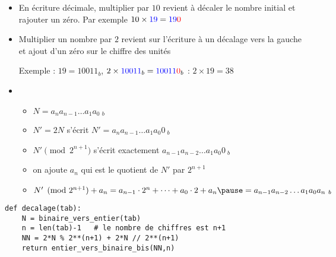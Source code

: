 \begin{frame}[fragile]

\begin{itemize}
  \item En écriture décimale, multiplier par $10$ revient à décaler le nombre initial et rajouter un zéro.
Par exemple $10\times{\color{blue}19} = {\color{blue}19}{\color{red}0}$

\pause

  \item Multiplier un nombre par $2$ revient sur l'écriture à un décalage 
vers la gauche et ajout d'un zéro sur le chiffre des unités

\pause

Exemple : $19 = 10011_b$, $2 \times{\color{blue}10011}_b  = {\color{blue}10011}{\color{red}0}_b$ : $2 \times 19 = 38$ 

\pause

  \item 
  \begin{itemize}
    \item $N=a_n  a_{n-1}\ldots a_1 a_0 \ _b$
\pause      
    \item $N'=2N$ s'écrit $N' = a_n  a_{n-1}\ldots a_1 a_0 0 \ _b$
 \pause  
    \item $N' \pmod {2^{n+1}}$ s'écrit exactement $a_{n-1} a_{n-2} \ldots a_1 a_0 0 \ _b$
\pause
    \item  on ajoute $a_n$ qui est le quotient de $N'$ par $2^{n+1}$
\pause
    \item {\footnotesize $N'\pmod{2^{n+1}}+a_n = a_{n-1} \cdot 2^n+\cdots + a_0 \cdot 2 +a_n 
    \pause
    =a_{n-1} a_{n-2} \ldots a_1 a_0 a_n \ _b$}
  \end{itemize}

\end{itemize}

\pause

\begin{algo}[binaire.py (4)]
\begin{lstlisting}
def decalage(tab):
    N = binaire_vers_entier(tab)
    n = len(tab)-1   # le nombre de chiffres est n+1
    NN = 2*N % 2**(n+1) + 2*N // 2**(n+1)
    return entier_vers_binaire_bis(NN,n)
\end{lstlisting}  
\end{algo}

\end{frame}



